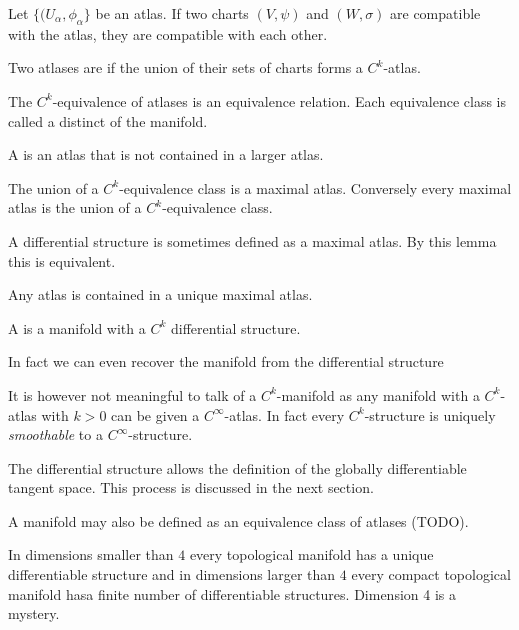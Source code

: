 \begin{lemma}
Let $\{(U_\alpha, \phi_\alpha\}$ be an atlas. If two charts $(V,\psi)$ and $(W,\sigma)$ are compatible with the atlas, they are compatible with each other.
\end{lemma}

Two atlases are  if the union of their sets of charts forms a $C^k$-atlas.

\begin{lemma}
The $C^k$-equivalence of atlases is an equivalence relation. Each equivalence class is called a distinct  of the manifold.
\end{lemma}

A  is an atlas that is not contained in a larger atlas.

\begin{lemma}
The union of a $C^k$-equivalence class is a maximal atlas. Conversely every maximal atlas is the union of a $C^k$-equivalence class.
\end{lemma}
A differential structure is sometimes defined as a maximal atlas. By this lemma this is equivalent.

\begin{corollary}
Any atlas is contained in a unique maximal atlas.
\end{corollary}

\begin{definition}
A  is a manifold with a $C^k$ differential structure.
\end{definition}
In fact we can even recover the manifold from the differential structure

It is however not meaningful to talk of a $C^k$-manifold as any manifold with a $C^k$-atlas with $k>0$ can be given a $C^\infty$-atlas. In fact every $C^k$-structure is uniquely \textit{smoothable} to a $C^\infty$-structure.

The differential structure allows the definition of the globally differentiable tangent space. This process is discussed in the next section.

A manifold may also be defined as an equivalence class of atlases (TODO).

In dimensions smaller than $4$ every topological manifold has a unique differentiable structure and in dimensions larger than $4$ every compact topological manifold hasa finite number of differentiable structures. Dimension 4 is a mystery.

